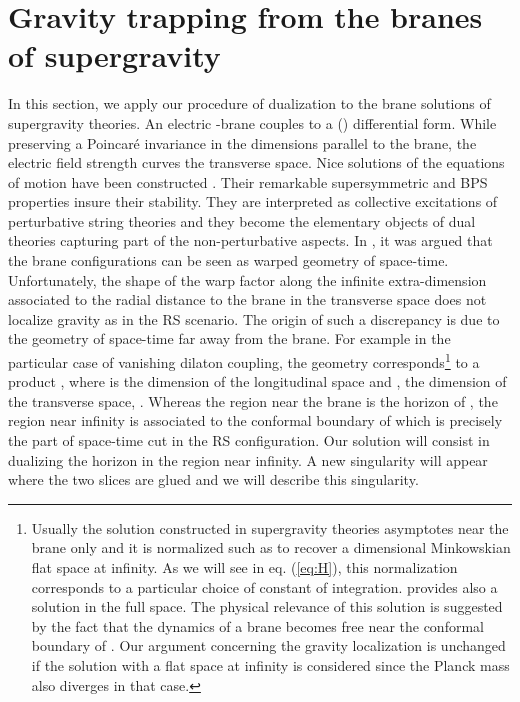 \documentclass[a4paper,12pt]{article}
\def\dpar{d_{\scriptscriptstyle\parallel}}
\def\dperp{d_{\scriptscriptstyle\perp}}
\begin{document}
\section{Gravity trapping from the branes of supergravity}

In this section, we apply our procedure of \coordHE{} dualization to the
brane solutions of supergravity theories. An electric \coordHE{}-brane couples
to a (\coordHE{}) differential form. While preserving a Poincar\'e invariance
in the dimensions parallel to the brane, the electric field strength curves
the transverse space. Nice solutions of the equations of motion have been
constructed \cite{SugraBranes}. Their remarkable supersymmetric and BPS properties
insure their stability. They are interpreted as collective excitations
of perturbative string theories and they become the elementary objects of dual
theories capturing part of the non-perturbative aspects.
In \cite{CGS3}, it was argued that the brane configurations can be seen
as warped geometry of space-time. Unfortunately, the shape of the warp factor
along the infinite extra-dimension associated to the radial distance to the brane
in the transverse space does not localize gravity as in the RS scenario.
The origin of such a discrepancy is due to the geometry of space-time far away
from the brane. For example in the particular case of vanishing dilaton coupling,
the geometry corresponds\footnote{Usually the solution constructed in supergravity
theories asymptotes \myHighlight{$AdS_{\dpar+1}\times S^{\dperp-1}$}\coordHE{} near the brane only and it
is normalized such as to recover a \coordHE{} dimensional Minkowskian flat space
at infinity. As we will see in eq. (\ref{eq:H}), this normalization corresponds
to a particular choice of constant of integration.
\myHighlight{$AdS_{\dpar+1}\times S^{\dperp-1}$}\coordHE{} provides also a solution in the full space.
The physical relevance of this solution is suggested by the fact that the
dynamics of a brane becomes free near the conformal boundary of \coordHE{}
\cite{GM}. Our argument concerning the gravity localization is unchanged
if the solution with a flat space at infinity is considered since the \myHighlight{$\dpar$}\coordHE{} Planck
mass also diverges in that case.}
to a product \myHighlight{$AdS_{\dpar+1}\times S^{\dperp-1}$}\coordHE{}, where \myHighlight{$\dpar$}\coordHE{} is
the dimension of the longitudinal space and \myHighlight{$\dperp$}\coordHE{}, the dimension of the transverse
space, \myHighlight{$\dpar+\dperp=D$}\coordHE{}. Whereas the region near the brane is the horizon of \coordHE{},
the region near infinity is associated to the conformal boundary of \coordHE{} which
is precisely the part of space-time cut in the RS configuration.
Our solution will consist in \coordHE{} dualizing the \coordHE{} horizon in the region near
infinity. A new singularity will appear where the two slices are glued
and we will describe this singularity.
\end{document}
